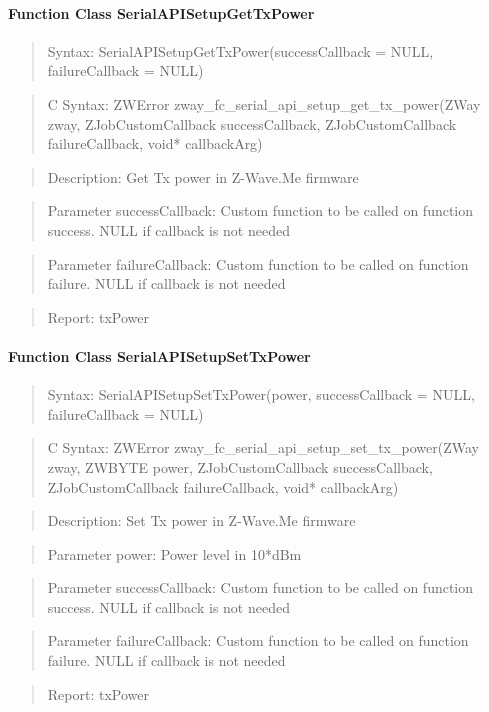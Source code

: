 \paragraph{Function Class SerialAPISetupGetTxPower}
\begin{quote}Syntax: SerialAPISetupGetTxPower(successCallback = NULL, failureCallback = NULL)\end{quote}
\begin{quote}C Syntax: ZWError zway\_fc\_serial\_api\_setup\_get\_tx\_power(ZWay zway, ZJobCustomCallback successCallback, ZJobCustomCallback failureCallback, void* callbackArg)\end{quote}
\begin{quote}Description: Get Tx power in Z-Wave.Me firmware\end{quote}
\begin{quote}Parameter successCallback: Custom function to be called on function success. NULL if callback is not needed\end{quote}
\begin{quote}Parameter failureCallback: Custom function to be called on function failure. NULL if callback is not needed\end{quote}
\begin{quote}Report: txPower\end{quote}

\paragraph{Function Class SerialAPISetupSetTxPower}
\begin{quote}Syntax: SerialAPISetupSetTxPower(power, successCallback = NULL, failureCallback = NULL)\end{quote}
\begin{quote}C Syntax: ZWError zway\_fc\_serial\_api\_setup\_set\_tx\_power(ZWay zway, ZWBYTE power, ZJobCustomCallback successCallback, ZJobCustomCallback failureCallback, void* callbackArg)\end{quote}
\begin{quote}Description: Set Tx power in Z-Wave.Me firmware\end{quote}
\begin{quote}Parameter power: Power level in 10*dBm\end{quote}
\begin{quote}Parameter successCallback: Custom function to be called on function success. NULL if callback is not needed\end{quote}
\begin{quote}Parameter failureCallback: Custom function to be called on function failure. NULL if callback is not needed\end{quote}
\begin{quote}Report: txPower\end{quote}

